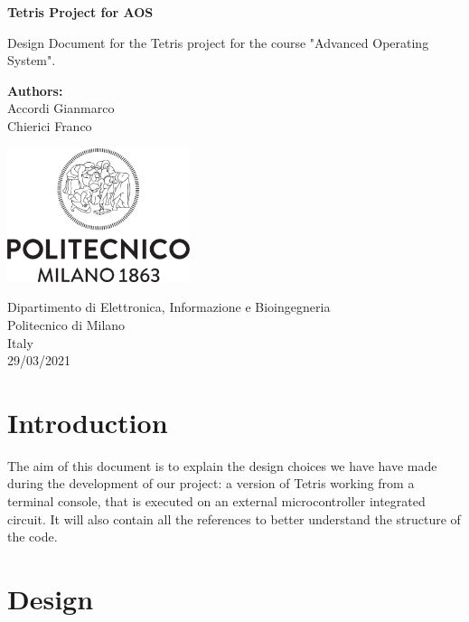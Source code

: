 \documentclass{article}
\begin{document}
\begin{titlepage}
    \begin{center}
       \vspace*{4cm}

       \textbf{\LARGE Tetris Project for AOS}

       \vspace{1.5cm}
        Design Document for the Tetris project for the course "Advanced Operating System".
            
       \vfill

       \textbf{Authors:}\\
       Accordi Gianmarco\\
       Chierici Franco

       \vspace{0.8cm}
     
       \includegraphics[width=0.4\textwidth]{img/Logo_Politecnico_Milano.png}
            
       Dipartimento di Elettronica, Informazione e Bioingegneria\\
       Politecnico di Milano\\
       Italy\\
       29/03/2021
            
   \end{center}
\end{titlepage}

\tableofcontents

\newpage

\section{Introduction}
The aim of this document is to explain the design choices we have have made during the development of our project: a version of Tetris working from a terminal console, that is executed on an external microcontroller integrated circuit. 
It will also contain all the references to better understand the structure of the code.

\section{Design}
\end{document}
